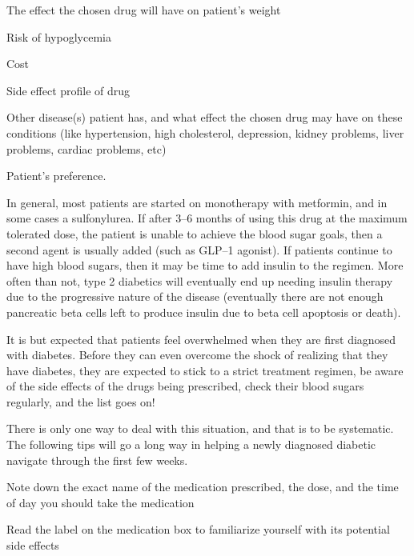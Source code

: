  \item The effect the chosen drug will have on patient’s weight

 \item Risk of hypoglycemia

 \item Cost

 \item Side effect profile of drug

 \item Other disease(s) patient has, and what effect the chosen drug may have on these conditions (like hypertension, high cholesterol, depression, kidney problems, liver problems, cardiac problems, etc)

 \item Patient’s preference.

In general, most patients are started on monotherapy with metformin, and in some cases a sulfonylurea. If after 3–6 months of using this drug at the maximum tolerated dose, the patient is unable to achieve the blood sugar goals, then a second agent is usually added (such as GLP–1 agonist). If patients continue to have high blood sugars, then it may be time to add insulin to the regimen. More often than not, type 2 diabetics will eventually end up needing insulin therapy due to the progressive nature of the disease (eventually there are not enough pancreatic beta cells left to produce insulin due to beta cell apoptosis or death).


It is but expected that patients feel overwhelmed when they are first diagnosed with diabetes. Before they can even overcome the shock of realizing that they have diabetes, they are expected to stick to a strict treatment regimen, be aware of the side effects of the drugs being prescribed, check their blood sugars regularly, and the list goes on!

There is only one way to deal with this situation, and that is to be systematic. The following tips will go a long way in helping a newly diagnosed diabetic navigate through the first few weeks.

\item Note down the exact name of the medication prescribed, the dose, and the time of day you should take the medication

 \item Read the label on the medication box to familiarize yourself with its potential side effects

